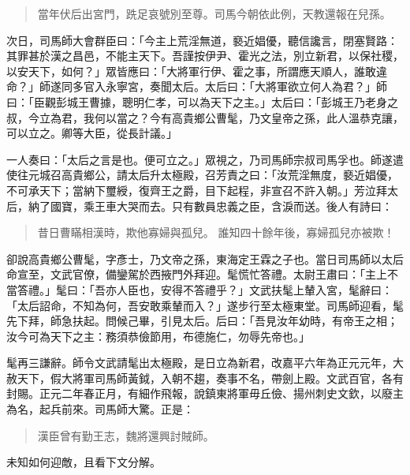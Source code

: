 \begin{quote}
當年伏后出宮門，跣足哀號別至尊。司馬今朝依此例，天教還報在兒孫。
\end{quote}

次日，司馬師大會群臣曰：「今主上荒淫無道，褻近娼優，聽信讒言，閉塞賢路：其罪甚於漢之昌邑，不能主天下。吾謹按伊尹、霍光之法，別立新君，以保社稷，以安天下，如何？」眾皆應曰：「大將軍行伊、霍之事，所謂應天順人，誰敢違命？」師遂同多官入永寧宮，奏聞太后。太后曰：「大將軍欲立何人為君？」師曰：「臣觀彭城王曹據，聰明仁孝，可以為天下之主。」太后曰：「彭城王乃老身之叔，今立為君，我何以當之？今有高貴鄉公曹髦，乃文皇帝之孫，此人溫恭克讓，可以立之。卿等大臣，從長計議。」

一人奏曰：「太后之言是也。便可立之。」眾視之，乃司馬師宗叔司馬孚也。師遂遣使往元城召高貴鄉公，請太后升太極殿，召芳責之曰：「汝荒淫無度，褻近娼優，不可承天下；當納下璽綬，復齊王之爵，目下起程，非宣召不許入朝。」芳泣拜太后，納了國寶，乘王車大哭而去。只有數員忠義之臣，含淚而送。後人有詩曰：

\begin{quote}
昔日曹瞞相漢時，欺他寡婦與孤兒。
誰知四十餘年後，寡婦孤兒亦被欺！
\end{quote}

卻說高貴鄉公曹髦，字彥士，乃文帝之孫，東海定王霖之子也。當日司馬師以太后命宣至，文武官僚，備鑾駕於西掖門外拜迎。髦慌忙答禮。太尉王肅曰：「主上不當答禮。」髦曰：「吾亦人臣也，安得不答禮乎？」文武扶髦上輦入宮，髦辭曰：「太后詔命，不知為何，吾安敢乘輦而入？」遂步行至太極東堂。司馬師迎看，髦先下拜，師急扶起。問候己畢，引見太后。后曰：「吾見汝年幼時，有帝王之相；汝今可為天下之主：務須恭儉節用，布德施仁，勿辱先帝也。」

髦再三謙辭。師令文武請髦出太極殿，是日立為新君，改嘉平六年為正元元年，大赦天下，假大將軍司馬師黃鉞，入朝不趨，奏事不名，帶劍上殿。文武百官，各有封賜。正元二年春正月，有細作飛報，說鎮東將軍毋丘儉、揚州刺史文欽，以廢主為名，起兵前來。司馬師大驚。正是：

\begin{quote}
漢臣曾有勤王志，魏將還興討賊師。
\end{quote}

未知如何迎敵，且看下文分解。
